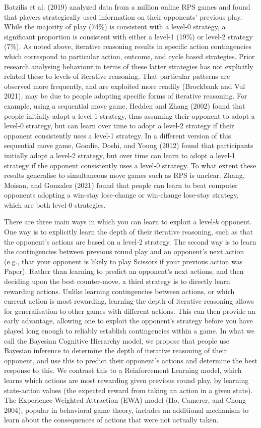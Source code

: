 \documentclass[smallextended]{svjour3}       %
\begin{document}
Batzilis et al. (2019) analyzed data from a million online RPS games and
found that players strategically used information on their opponents'
previous play. While the majority of play (74\%) is consistent with a
level-0 strategy, a significant proportion is consistent with either a
level-1 (19\%) or level-2 strategy (7\%). As noted above, iterative
reasoning results in specific action contingencies which correspond to
particular action, outcome, and cycle based strategies. Prior research
analysing behaviour in terms of these latter strategies has not
explicitly related these to levels of iterative reasoning. That
particular patterns are observed more frequently, and are exploited more
readily (Brockbank and Vul 2021), may be due to people adopting specific
forms of iterative reasoning. For example, using a sequential move game,
Hedden and Zhang (2002) found that people initially adopt a level-1
strategy, thus assuming their opponent to adopt a level-0 strategy, but
can learn over time to adopt a level-2 strategy if their opponent
consistently uses a level-1 strategy. In a different version of this
sequential move game, Goodie, Doshi, and Young (2012) found that
participants initially adopt a level-2 strategy, but over time can learn
to adopt a level-1 strategy if the opponent consistently uses a level-0
strategy. To what extent these results generalise to simultaneous move
games such as RPS is unclear. Zhang, Moisan, and Gonzalez (2021) found
that people can learn to beat computer opponents adopting a win-stay
lose-change or win-change lose-stay strategy, which are both level-0
strategies.

There are three main ways in which you can learn to exploit a
level-\(k\) opponent. One way is to explicitly learn the depth of their
iterative reasoning, such as that the opponent's actions are based on a
level-2 strategy. The second way is to learn the contingencies between
previous round play and an opponent's next action (e.g., that your
opponent is likely to play Scissors if your previous action was Paper).
Rather than learning to predict an opponent's next actions, and then
deciding upon the best counter-move, a third strategy is to directly
learn rewarding actions. Unlike learning contingencies between actions,
or which current action is most rewarding, learning the depth of
iterative reasoning allows for generalisation to other games with
different actions. This can then provide an early advantage, allowing
one to exploit the opponent's strategy before you have played long
enough to reliably establish contingencies within a game. In what we
call the Bayesian Cognitive Hierarchy model, we propose that people use
Bayesian inference to determine the depth of iterative reasoning of
their opponent, and use this to predict their opponent's actions and
determine the best response to this. We contrast this to a Reinforcement
Learning model, which learns which actions are most rewarding given
previous round play, by learning state-action values (the expected
reward from taking an action in a given state). The Experience Weighted
Attraction (EWA) model (Ho, Camerer, and Chong 2004), popular in
behavioral game theory, includes an additional mechanism to learn about
the consequences of actions that were not actually taken.
\end{document}

